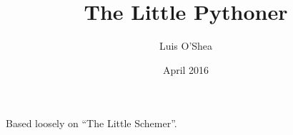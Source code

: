 \documentclass{article}
\title{The Little Pythoner}
\author{Luis O'Shea}
\date{April 2016}
\begin{document}
\maketitle

Based loosely on ``The Little Schemer''.
\end{document}
